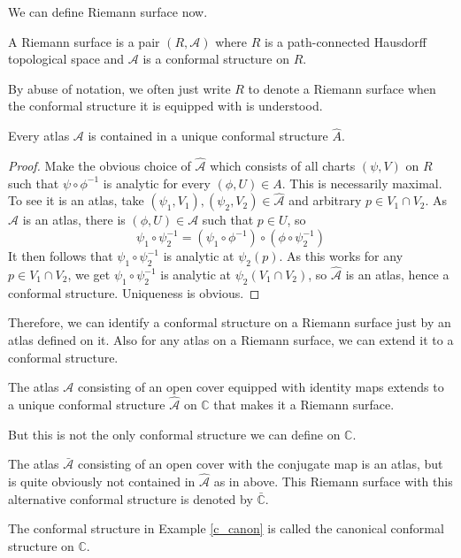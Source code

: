 We can define Riemann surface now.
\begin{definition}
    A Riemann surface is a pair $(R,\mathcal A)$ where $R$ is a path-connected Hausdorff topological space and $\mathcal A$ is a conformal structure on $R$.
\end{definition}
By abuse of notation, we often just write $R$ to denote a Riemann surface when the conformal structure it is equipped with is understood.
\begin{lemma}
    Every atlas $\mathcal A$ is contained in a unique conformal structure $\hat{A}$.
\end{lemma}
\begin{proof}
    Make the obvious choice of $\hat{\mathcal A}$ which consists of all charts $(\psi,V)$ on $R$ such that $\psi\circ\phi^{-1}$ is analytic for every $(\phi,U)\in A$.
    This is necessarily maximal.
    To see it is an atlas, take $(\psi_1,V_1),(\psi_2,V_2)\in\hat{\mathcal A}$ and arbitrary $p\in V_1\cap V_2$.
    As $\mathcal A$ is an atlas, there is $(\phi,U)\in\mathcal A$ such that $p\in U$, so
    $$\psi_1\circ\psi_2^{-1}=(\psi_1\circ\phi^{-1})\circ(\phi\circ\psi_2^{-1})$$
    It then follows that $\psi_1\circ\psi_2^{-1}$ is analytic at $\psi_2(p)$.
    As this works for any $p\in V_1\cap V_2$, we get $\psi_1\circ\psi_2^{-1}$ is analytic at $\psi_2(V_1\cap V_2)$, so $\hat{\mathcal A}$ is an atlas, hence a conformal structure.
    Uniqueness is obvious.
\end{proof}
Therefore, we can identify a conformal structure on a Riemann surface just by an atlas defined on it.
Also for any atlas on a Riemann surface, we can extend it to a conformal structure.
\begin{example}\label{c_canon}
    The atlas $\mathcal A$ consisting of an open cover equipped with identity maps extends to a unique conformal structure $\hat{\mathcal A}$ on $\mathbb C$ that makes it a Riemann surface.
\end{example}
But this is not the only conformal structure we can define on $\mathbb C$.
\begin{example}
    The atlas $\bar{\mathcal A}$ consisting of an open cover with the conjugate map is an atlas, but is quite obviously not contained in $\hat{\mathcal A}$ as in above.
    This Riemann surface with this alternative conformal structure is denoted by $\bar{\mathbb C}$.
\end{example}
\begin{definition}
    The conformal structure in Example \ref{c_canon} is called the canonical conformal structure on $\mathbb C$.
\end{definition}
